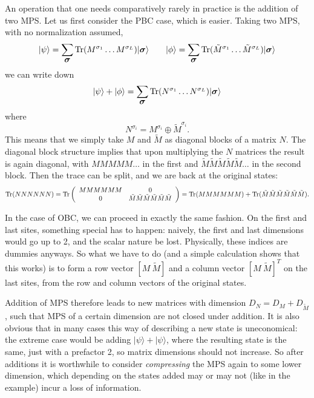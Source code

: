 \documentclass[a4paper,10pt,oneside,onecolumn,1p,times]{elsarticle}
\newcommand{\tr}{{\rm Tr }}
\newcommand{\ket}[1]{\mbox{$| #1  \rangle$}}
\newcommand{\fat}[1]{\mbox{\boldmath$#1$\unboldmath}}	%
\begin{document}
An operation that one needs comparatively rarely in practice is the addition of two MPS. Let us first consider the PBC case, which is easier. Taking two MPS, with no normalization assumed,
\begin{equation}
\ket{\psi} = \sum_{\fat{\sigma}} \tr (M^{\sigma_1} \ldots M^{\sigma_L}) \ket{\fat{\sigma}} 
\quad\quad
\ket{\phi} = \sum_{\fat{\sigma}} \tr (\tilde{M}^{\sigma_1} \ldots \tilde{M}^{\sigma_L}) \ket{\fat{\sigma}} 
\end{equation}
we can write down
\begin{equation}
\ket{\psi} + \ket{\phi} = \sum_{\fat{\sigma}} \tr (N^{\sigma_1} \ldots N^{\sigma_L}) \ket{\fat{\sigma}}
\end{equation}
where 
\begin{equation}
N^{\sigma_i} =  M^{\sigma_i} \oplus \tilde{M}^{\sigma_i} .
\end{equation} 
This means that we simply take $M$ and $\tilde{M}$ as diagonal blocks of a matrix $N$. The diagonal block structure implies that upon multiplying the $N$ matrices the result is again diagonal, with $MMMMM\ldots$ in the first and $\tilde{M}\tilde{M}\tilde{M}\tilde{M}\tilde{M}\ldots$ in the second block. Then the trace can be split, and we are back at the original states:
\begin{equation}
\tr (NNNNNN) = \tr \left( \begin{array}{cc} MMMMMM & 0 \\ 0 & \tilde{M}\tilde{M}\tilde{M}\tilde{M}\tilde{M}\tilde{M} \end{array} \right) = \tr (MMMMMM) + \tr (\tilde{M}\tilde{M}\tilde{M}\tilde{M}\tilde{M}\tilde{M}).
\end{equation} 

In the case of OBC, we can proceed in exactly the same fashion. On the first and last sites, something special has to happen: naively, the first and last dimensions would go up to 2, and the scalar nature be lost. Physically, these indices are dummies anyways. So what we have to do (and a simple calculation shows that this works) is to form a row vector $[ M\ \tilde{M}]$ and a column vector $[M\ \tilde{M}]^T$ on the last sites, from the row and column vectors of the original states.

Addition of MPS therefore leads to new matrices with dimension $D_N = D_M + D_{\tilde{M}}$, such that MPS of a certain dimension are not closed under addition. It is also obvious that in many cases this way of describing a new state is uneconomical: the extreme case would be adding $\ket{\psi}+\ket{\psi}$, where the resulting state is the same, just with a prefactor 2, so matrix dimensions should not increase. So after additions it is worthwhile to consider {\em compressing} the MPS again to some lower dimension, which depending on the states added may or may not (like in the example) incur a loss of information.
\end{document}
